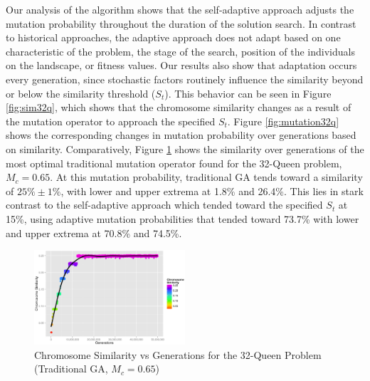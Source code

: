\documentclass[conference]{IEEEtran}
\begin{document}
Our analysis of the algorithm shows that the self-adaptive approach adjusts the mutation probability throughout the duration of the solution search. In contrast to historical approaches, the adaptive approach does not adapt based on one characteristic of the problem, the stage of the search, position of the individuals on the landscape, or fitness values. Our results also show that adaptation occurs every generation, since stochastic factors routinely influence the similarity beyond or below the similarity threshold ($S_{t}$). This behavior can be seen in Figure \ref{fig:sim32q}, which shows that the chromosome similarity changes as a result of the mutation operator to approach the specified $S_{t}$. Figure \ref{fig:mutation32q} shows the corresponding changes in mutation probability over generations based on similarity. Comparatively, Figure \ref{fig:bestfixedn32q} shows the similarity over generations of the most optimal traditional mutation operator found for the 32-Queen problem, $M_{c} = 0.65$. At this mutation probability, traditional GA tends toward a similarity of $25\% \pm 1\%$, with lower and upper extrema at 1.8\% and 26.4\%. This lies in stark contrast to the self-adaptive approach which tended toward the specified $S_{t}$ at 15\%, using adaptive mutation probabilities that tended toward 73.7\% with lower and upper extrema at 70.8\% and 74.5\%.

\begin{figure}[htp]
\centerline{\includegraphics[width=0.50\textwidth]{figures/similarity_0.65_32q_3.png}}
\vspace{-6pt}
\caption{Chromosome Similarity vs Generations for the 32-Queen Problem (Traditional GA, $M_{c} = 0.65$)} 
\label{fig:bestfixedn32q}
\end{figure}
\end{document}
